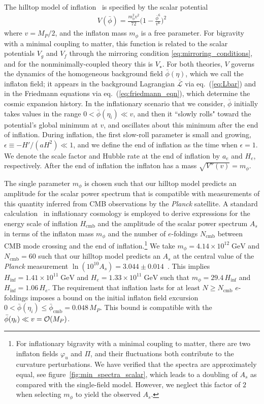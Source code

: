 \documentclass[11pt,a4paper]{article}
\newcommand{\ba}[1]{\begin{align} #1 \end{align}}
\newcommand{\Lcal}{\mathcal{L}}
\newcommand{\Mpl}{M_P}
\newcommand{\GeV}{{\; \mathrm{GeV}}}
\newcommand{\fref}[1]{figure~\ref{#1}}
\newcommand{\eref}[1]{eq.~(\ref{#1})}
\begin{document}
The hilltop model of inflation~\cite{Kumekawa:1994gx,Izawa:1996dv} is specified by the scalar potential 
\ba{
    V(\bar{\phi}) = \frac{m_\phi^2 v^2}{72} \bigg(1 - \frac{\bar{\phi}^6}{v^6} \bigg)^2
}
where $v = \Mpl/2$, and the inflaton mass $m_\phi$ is a free parameter.  For bigravity with a minimal coupling to matter, this function is related to the scalar potentials $V_g$ and $V_f$ through the mirroring condition \eqref{eq:mirroring_conditions}, and for the nonminimally-coupled theory this is $V_\star$.  For both theories, $V$ governs the dynamics of the homogeneous background field $\bar{\phi}(\eta)$, which we call the inflaton field; it appears in the background Lagrangian $\bar{\Lcal}$ via \eref{eq:Lbar} and in the Friedmann equations via \eref{eq:friedmann_eqn}, which determine the cosmic expansion history.  In the inflationary scenario that we consider, $\bar{\phi}$ initially takes values in the range $0 < \bar{\phi}(\eta_i) \ll v$, and then it ``slowly rolls" toward the potential's global minimum at $v$, and oscillates about this minimum after the end of inflation.  During inflation, the first slow-roll parameter is small and growing, $\epsilon \equiv -H' / (a H^2) \ll 1$, and we define the end of inflation as the time when $\epsilon = 1$.  We denote the scale factor and Hubble rate at the end of inflation by $a_e$ and $H_e$, respectively.  After the end of inflation the inflaton has a mass $\sqrt{V''(v)} = m_\phi$.

The single parameter $m_\phi$ is chosen such that our hilltop model predicts an amplitude for the scalar power spectrum that is compatible with measurements of this quantity inferred from CMB observations by the \textit{Planck} satellite.  A standard calculation~\cite{Baumann:2009ds} in inflationary cosmology is employed to derive expressions for the energy scale of inflation $H_\mathrm{cmb}$ and the amplitude of the scalar power spectrum $A_s$ in terms of the inflaton mass $m_\phi$ and the number of $e$-foldings $N_\mathrm{cmb}$ between CMB mode crossing and the end of inflation.\footnote{For inflationary bigravity with a minimal coupling to matter, there are two inflaton fields $\varphi_u$ and $\Pi$, and their fluctuations both contribute to the curvature perturbations.  We have verified that the spectra are approximately equal, see \fref{fig:min_spectra_scalar}, which leads to a doubling of $A_s$ as compared with the single-field model.  However, we neglect this factor of $2$ when selecting $m_\phi$ to yield the observed $A_s$.  }  We take $m_\phi = 4.14 \times 10^{12} \GeV$ and $N_\mathrm{cmb} = 60$ such that our hilltop model predicts an $A_s$ at the central value of the \textit{Planck} measurement $\ln(10^{10} A_s) = 3.044 \pm 0.014$~\cite{Planck:2018vyg}.  This implies $H_\mathrm{inf} = 1.41 \times 10^{11} \GeV$ and $H_e = 1.33 \times 10^{11} \GeV$ such that $m_\phi = 29.4 \, H_\mathrm{inf}$ and $H_\mathrm{inf} = 1.06 \, H_e$.  The requirement that inflation lasts for at least $N \geq N_\mathrm{cmb}$ $e$-foldings imposes a bound on the initial inflaton field excursion $0 < \bar{\phi}(\eta_i) \leq \bar{\phi}_\mathrm{cmb} = 0.048 \, \Mpl$.  This bound is compatible with the $\bar{\phi}(\eta_i) \ll v = \order{\Mpl}$.  
\end{document}
